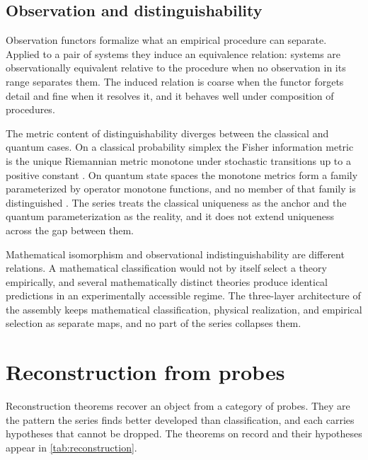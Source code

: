 \documentclass[11pt,letterpaper]{article}
\theoremstyle{definition}
\theoremstyle{remark}
\begin{document}
\subsection{Observation and distinguishability}

Observation functors formalize what an empirical procedure can separate. Applied to a pair of systems they induce an equivalence relation: systems are observationally equivalent relative to the procedure when no observation in its range separates them. The induced relation is coarse when the functor forgets detail and fine when it resolves it, and it behaves well under composition of procedures.

The metric content of distinguishability diverges between the classical and quantum cases. On a classical probability simplex the Fisher information metric is the unique Riemannian metric monotone under stochastic transitions up to a positive constant \cite{corpus-52}. On quantum state spaces the monotone metrics form a family parameterized by operator monotone functions, and no member of that family is distinguished \cite{corpus-52}. The series treats the classical uniqueness as the anchor and the quantum parameterization as the reality, and it does not extend uniqueness across the gap between them.

Mathematical isomorphism and observational indistinguishability are different relations. A mathematical classification would not by itself select a theory empirically, and several mathematically distinct theories produce identical predictions in an experimentally accessible regime. The three-layer architecture of the assembly keeps mathematical classification, physical realization, and empirical selection as separate maps, and no part of the series collapses them.

\section{Reconstruction from probes}

Reconstruction theorems recover an object from a category of probes. They are the pattern the series finds better developed than classification, and each carries hypotheses that cannot be dropped. The theorems on record and their hypotheses appear in \cref{tab:reconstruction}.
\end{document}
